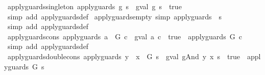 \begin{isabellebody}
\endisatagproof
{\isafoldproof}%
%
\isadelimproof
\isanewline
%
\endisadelimproof
\isanewline
{}\isamarkupfalse%
\ apply{\isacharunderscore}guards{\isacharunderscore}singleton{\isacharcolon}\ {\isachardoublequoteopen}{\isacharparenleft}apply{\isacharunderscore}guards\ {\isacharbrackleft}g{\isacharbrackright}\ s{\isacharparenright}\ {\isacharequal}\ {\isacharparenleft}gval\ g\ s\ {\isacharequal}\ true{\isacharparenright}{\isachardoublequoteclose}\isanewline
%
\isadelimproof
\ \ %
\endisadelimproof
%
\isatagproof
{}\isamarkupfalse%
\ {\isacharparenleft}simp\ add{\isacharcolon}\ apply{\isacharunderscore}guards{\isacharunderscore}def{\isacharparenright}%
\endisatagproof
{\isafoldproof}%
%
\isadelimproof
\isanewline
%
\endisadelimproof
\isanewline
{}\isamarkupfalse%
\ apply{\isacharunderscore}guards{\isacharunderscore}empty\ {\isacharbrackleft}simp{\isacharbrackright}{\isacharcolon}\ {\isachardoublequoteopen}apply{\isacharunderscore}guards\ {\isacharbrackleft}{\isacharbrackright}\ s{\isachardoublequoteclose}\isanewline
%
\isadelimproof
\ \ %
\endisadelimproof
%
\isatagproof
{}\isamarkupfalse%
\ {\isacharparenleft}simp\ add{\isacharcolon}\ apply{\isacharunderscore}guards{\isacharunderscore}def{\isacharparenright}%
\endisatagproof
{\isafoldproof}%
%
\isadelimproof
\isanewline
%
\endisadelimproof
\isanewline
{}\isamarkupfalse%
\ apply{\isacharunderscore}guards{\isacharunderscore}cons{\isacharcolon}\ {\isachardoublequoteopen}apply{\isacharunderscore}guards\ {\isacharparenleft}a\ {\isacharhash}\ G{\isacharparenright}\ c\ {\isacharequal}\ {\isacharparenleft}gval\ a\ c\ {\isacharequal}\ true\ {\isasymand}\ apply{\isacharunderscore}guards\ G\ c{\isacharparenright}{\isachardoublequoteclose}\isanewline
%
\isadelimproof
\ \ %
\endisadelimproof
%
\isatagproof
{}\isamarkupfalse%
\ {\isacharparenleft}simp\ add{\isacharcolon}\ apply{\isacharunderscore}guards{\isacharunderscore}def{\isacharparenright}%
\endisatagproof
{\isafoldproof}%
%
\isadelimproof
\isanewline
%
\endisadelimproof
\isanewline
{}\isamarkupfalse%
\ apply{\isacharunderscore}guards{\isacharunderscore}double{\isacharunderscore}cons{\isacharcolon}\ {\isachardoublequoteopen}apply{\isacharunderscore}guards\ {\isacharparenleft}y\ {\isacharhash}\ x\ {\isacharhash}\ G{\isacharparenright}\ s\ {\isacharequal}\ {\isacharparenleft}gval\ {\isacharparenleft}gAnd\ y\ x{\isacharparenright}\ s\ {\isacharequal}\ true\ {\isasymand}\ apply{\isacharunderscore}guards\ G\ s{\isacharparenright}{\isachardoublequoteclose}\isanewline

\end{isabellebody}
